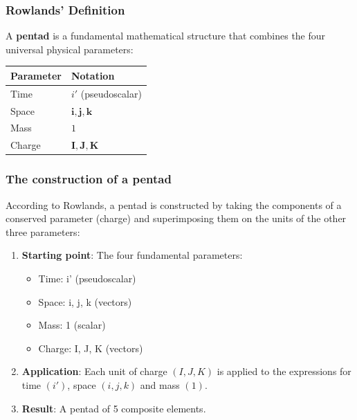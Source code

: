 \documentclass[11pt]{article}
\providecommand{\tightlist}{%
\setlength{\itemsep}{2pt}\setlength{\parskip}{6pt}
}
\begin{document}
\hypertarget{rowlands-definition}{%
\subsubsection{Rowlands' Definition}\label{rowlands-definition}}

A \textbf{pentad} is a fundamental mathematical structure that combines
the four universal physical parameters:

\begin{longtable}[]{@{}ll@{}}
\toprule
Parameter & Notation \\
\midrule
\endhead
Time & \(i'\) (pseudoscalar) \\
Space & \(\mathbf{i}, \mathbf{j}, \mathbf{k}\) \\
Mass & \(1\) \\
Charge & \(\mathbf{I}, \mathbf{J}, \mathbf{K}\) \\
\bottomrule
\end{longtable}

\hypertarget{the-construction-of-a-pentad}{%
\subsubsection{The construction of a
pentad}\label{the-construction-of-a-pentad}}

According to Rowlands, a pentad is constructed by taking the components
of a conserved parameter (charge) and superimposing them on the units of
the other three parameters:

\begin{enumerate}
\def\labelenumi{\arabic{enumi}.}
\item
  \textbf{Starting point}: The four fundamental parameters:

  \begin{itemize}
  \tightlist
  \item
    Time: i' (pseudoscalar)
  \item
    Space: i, j, k (vectors)
  \item
    Mass: 1 (scalar)
  \item
    Charge: I, J, K (vectors)
  \end{itemize}
\item
  \textbf{Application}: Each unit of charge \((I, J, K)\) is applied to
  the expressions for time \((i')\), space \((i, j, k)\) and mass
  \((1)\).
\item
  \textbf{Result}: A pentad of 5 composite elements.
\end{enumerate}
\end{document}
